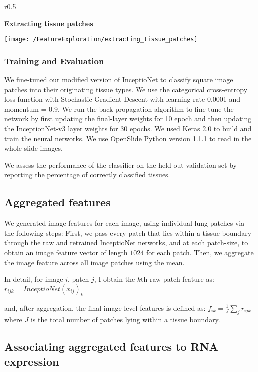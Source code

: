 \documentclass{article}
\newcommand*{\figuretitle}[1]{%
    {\centering%
    \textbf{#1}%
    \par\medskip}%
}
\begin{document}
\begin{wrapfigure}{r}{0.5\textwidth}
	\figuretitle{Extracting tissue patches}
	\begin{center}
	    \texttt{[image: /FeatureExploration/extracting\_tissue\_patches]} 
	\end{center}
	\caption{}
  \label{fig:extracting_tissue_patches}
\end{wrapfigure}


\subsubsection{Training and Evaluation}
We fine-tuned our modified version of InceptioNet to classify square image patches into their originating tissue types. We use the categorical cross-entropy loss function with Stochastic Gradient Descent with learning rate 0.0001 and momentum = 0.9. We run the back-propagation algorithm to fine-tune the network by first updating the final-layer weights for 10 epoch and then updating the InceptionNet-v3 layer weights for 30 epochs. We used Keras 2.0 \cite{keras} to build and train the neural networks. We use OpenSlide Python \cite{openslide}  version 1.1.1 to read in the whole slide images.


We assess the performance of the classifier on the held-out validation set by reporting the percentage of correctly classified tissues.

\subsection{Aggregated features}

We generated image features for each image, using individual lung patches via the following steps: First, we pass every patch that lies within a tissue boundary through the raw and retrained InceptioNet networks, and at each patch-size, to obtain an image feature vector of length $1024$ for each patch. Then, we aggregate the image feature across all image patches using the mean.

In detail, for image $i$, patch $j$, I obtain the $k$th raw patch feature as: $r_{ijk} =  InceptioNet(x_{ij})_k$

and, after aggregation, the final image level features is defined as: $f_{ik} = \frac{1}{J}\sum_j r_{ijk}$ where $J$ is the total number of patches lying within a tissue boundary.


\subsection{Associating aggregated features to RNA expression}
\end{document}
